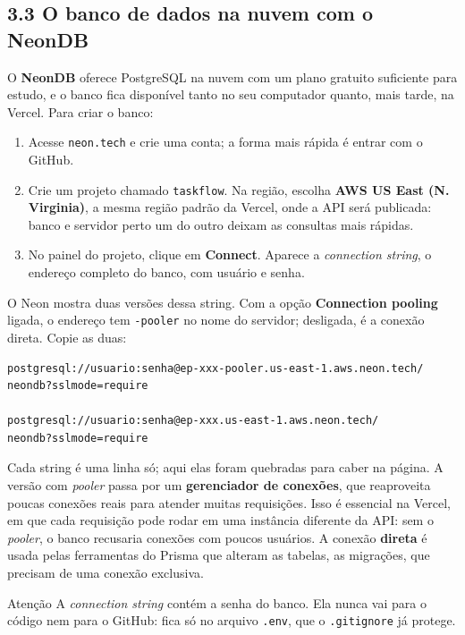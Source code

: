 \subsection{3.3 O banco de dados na nuvem com o NeonDB}

O \textbf{NeonDB} oferece PostgreSQL na nuvem com um plano gratuito suficiente para estudo, e o banco fica disponível tanto no seu computador quanto, mais tarde, na Vercel. Para criar o banco:

\begin{enumerate}
  \item Acesse \texttt{neon.tech} e crie uma conta; a forma mais rápida é entrar com o GitHub.
  \item Crie um projeto chamado \texttt{taskflow}. Na região, escolha \textbf{AWS US East (N. Virginia)}, a mesma região padrão da Vercel, onde a API será publicada: banco e servidor perto um do outro deixam as consultas mais rápidas.
  \item No painel do projeto, clique em \textbf{Connect}. Aparece a \textit{connection string}, o endereço completo do banco, com usuário e senha.
\end{enumerate}

O Neon mostra duas versões dessa string. Com a opção \textbf{Connection pooling} ligada, o endereço tem \texttt{-pooler} no nome do servidor; desligada, é a conexão direta. Copie as duas:

\begin{codigo}
\begin{Verbatim}[breaklines=true, breaksymbolleft={}, fontsize=\footnotesize]
postgresql://usuario:senha@ep-xxx-pooler.us-east-1.aws.neon.tech/
neondb?sslmode=require

postgresql://usuario:senha@ep-xxx.us-east-1.aws.neon.tech/
neondb?sslmode=require
\end{Verbatim}
\end{codigo}

Cada string é uma linha só; aqui elas foram quebradas para caber na página. A versão com \textit{pooler} passa por um \textbf{gerenciador de conexões}, que reaproveita poucas conexões reais para atender muitas requisições. Isso é essencial na Vercel, em que cada requisição pode rodar em uma instância diferente da API: sem o \textit{pooler}, o banco recusaria conexões com poucos usuários. A conexão \textbf{direta} é usada pelas ferramentas do Prisma que alteram as tabelas, as migrações, que precisam de uma conexão exclusiva.

\begin{destaque}{Atenção}
A \textit{connection string} contém a senha do banco. Ela nunca vai para o código nem para o GitHub: fica só no arquivo \texttt{.env}, que o \texttt{.gitignore} já protege.
\end{destaque}

